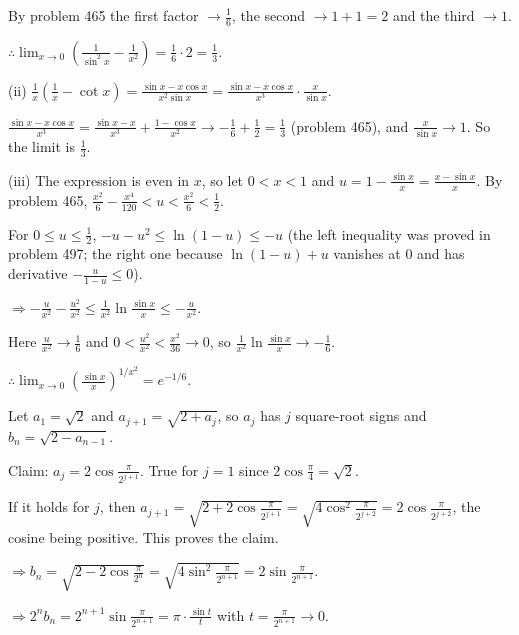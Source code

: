   By problem 465 the first factor $\to\frac{1}{6}$, the second $\to 1 + 1 = 2$ and the third $\to 1$.

  $\therefore\displaystyle\lim_{x\to 0}\left(\frac{1}{\sin^2x} - \frac{1}{x^2}\right) = \frac{1}{6}\cdot 2 =
  \frac{1}{3}$.

  (ii) $\frac{1}{x}\left(\frac{1}{x} - \cot x\right) = \frac{\sin x - x\cos x}{x^2\sin x} = \frac{\sin x - x\cos
    x}{x^3}\cdot\frac{x}{\sin x}$.

  $\frac{\sin x - x\cos x}{x^3} = \frac{\sin x - x}{x^3} + \frac{1 - \cos x}{x^2}\to -\frac{1}{6} + \frac{1}{2}
  = \frac{1}{3}$ (problem 465), and $\frac{x}{\sin x}\to 1$. So the limit is $\frac{1}{3}$.

  (iii) The expression is even in $x$, so let $0 < x < 1$ and $u = 1 - \frac{\sin x}{x} = \frac{x - \sin
    x}{x}$. By problem 465, $\frac{x^2}{6} - \frac{x^4}{120} < u < \frac{x^2}{6} < \frac{1}{2}$.

  For $0\leq u\leq\frac{1}{2}$, $-u - u^2\leq\ln(1 - u)\leq -u$ (the left inequality was proved in problem 497;
  the right one because $\ln(1 - u) + u$ vanishes at $0$ and has derivative $-\frac{u}{1 - u}\leq 0$).

  $\Rightarrow -\frac{u}{x^2} - \frac{u^2}{x^2}\leq\frac{1}{x^2}\ln\frac{\sin x}{x}\leq -\frac{u}{x^2}$.

  Here $\frac{u}{x^2}\to\frac{1}{6}$ and $0 < \frac{u^2}{x^2} < \frac{x^2}{36}\to 0$, so
  $\frac{1}{x^2}\ln\frac{\sin x}{x}\to -\frac{1}{6}$.

  $\therefore\displaystyle\lim_{x\to 0}\left(\frac{\sin x}{x}\right)^{1/x^2} = e^{-1/6}$.
\item Let $a_1 = \sqrt{2}$ and $a_{j + 1} = \sqrt{2 + a_j}$, so $a_j$ has $j$ square-root signs and $b_n =
  \sqrt{2 - a_{n - 1}}$.

  Claim: $a_j = 2\cos\frac{\pi}{2^{j + 1}}$. True for $j = 1$ since $2\cos\frac{\pi}{4} = \sqrt{2}$.

  If it holds for $j$, then $a_{j + 1} = \sqrt{2 + 2\cos\frac{\pi}{2^{j + 1}}} = \sqrt{4\cos^2\frac{\pi}{2^{j +
        2}}} = 2\cos\frac{\pi}{2^{j + 2}}$, the cosine being positive. This proves the claim.

  $\Rightarrow b_n = \sqrt{2 - 2\cos\frac{\pi}{2^n}} = \sqrt{4\sin^2\frac{\pi}{2^{n + 1}}} = 2\sin\frac{\pi}{2^{n
      + 1}}$.

  $\Rightarrow 2^nb_n = 2^{n + 1}\sin\frac{\pi}{2^{n + 1}} = \pi\cdot\frac{\sin t}{t}$ with $t =
  \frac{\pi}{2^{n + 1}}\to 0$.

